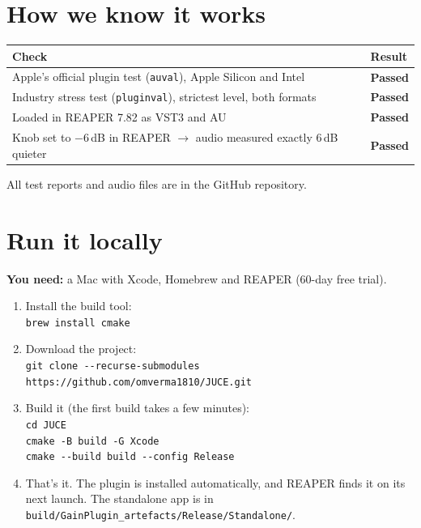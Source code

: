 \documentclass[11pt,a4paper]{article}
\newcommand{\pass}{\textcolor{ok}{\textbf{Passed}}}
\newcommand{\cmd}[1]{\colorbox{soft}{\texttt{\small #1}}}
\begin{document}
\section{How we know it works}
\begin{tabularx}{\linewidth}{@{}Xl@{}}
\toprule
\textbf{Check} & \textbf{Result} \\
\midrule
Apple's official plugin test (\texttt{auval}), Apple Silicon and Intel & \pass \\
Industry stress test (\texttt{pluginval}), strictest level, both formats & \pass \\
Loaded in REAPER 7.82 as VST3 and AU & \pass \\
Knob set to $-6$\,dB in REAPER $\rightarrow$ audio measured exactly 6\,dB quieter & \pass \\
\bottomrule
\end{tabularx}

\vspace{4pt}
All test reports and audio files are in the GitHub repository.

\section{Run it locally}
\textbf{You need:} a Mac with Xcode, Homebrew and REAPER (60-day free trial).
\begin{enumerate}
  \item Install the build tool:\\ \cmd{brew install cmake}
  \item Download the project:\\ \cmd{git clone -{}-recurse-submodules https://github.com/omverma1810/JUCE.git}
  \item Build it (the first build takes a few minutes):\\
        \cmd{cd JUCE} \\
        \cmd{cmake -B build -G Xcode} \\
        \cmd{cmake -{}-build build -{}-config Release}
  \item That's it. The plugin is installed automatically, and REAPER finds it on its next launch.
        The standalone app is in \texttt{build/GainPlugin\_artefacts/Release/Standalone/}.
\end{enumerate}
\end{document}
